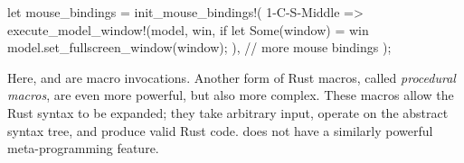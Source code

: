 \begin{rustblock}
  let mouse_bindings = init_mouse_bindings!(
    1-C-S-Middle => execute_model_window!(model, win,
      if let Some(window) = win {
        model.set_fullscreen_window(window);
      }
    ),
    // more mouse bindings
  );
\end{rustblock}

Here,  and  are macro
invocations. Another form of Rust macros, called \textit{procedural macros},
are even more powerful, but also more complex\cite{rustmacros}. These macros
allow the Rust syntax to be expanded; they take arbitrary input, operate on the
abstract syntax tree, and produce valid Rust code\cite{rustmacros}. \cpp does
not have a similarly powerful meta-programming feature\cite{cppstd}.

